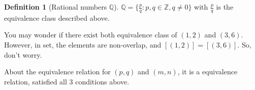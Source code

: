 \documentclass[12pt]{article}
\theoremstyle{definition}
\newtheorem{definition}{Definition}[section]
\theoremstyle{plain}
\begin{document}
\begin{definition}[Rational numbers $\mathbb{Q}$]
$\mathbb{Q} = \{\frac{p}{q}: p,q \in \mathbb{Z}, q \neq 0\}$ with $\frac{p}{q}$ is the equivalence class described above.
\end{definition}

\begin{note}
You may wonder if there exist both equivalence class of $(1,2)$ and $(3, 6)$. However, in set, the elements are non-overlap, and $[(1,2)] = [(3,6)]$. So, don't worry.
\end{note}

\begin{note}
About the equivalence relation for $(p,q)$ and $(m,n)$, it is a equivalence relation, satisfied all 3 conditions above.
\end{note}
\end{document}
